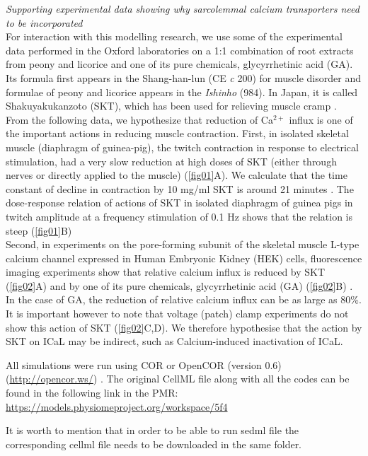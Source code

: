 \documentclass[fleqn,10pt]{physiome}
\begin{document}
\textit{Supporting experimental data showing why sarcolemmal calcium transporters need to be incorporated}\\\newline
For interaction with this modelling research, we use some of the experimental data performed in the Oxford laboratories on a 1:1 combination of root extracts from peony and licorice and one of its pure chemicals, glycyrrhetinic acid (GA). Its formula first appears in the Shang-han-lun (CE \textit{c} 200) for muscle disorder and formulae of peony and licorice appears in the \textit{Ishinho} (984). In Japan, it is called Shakuyakukanzoto (SKT), which has been used for relieving muscle cramp \citep{hyodo2006immediate}. From the following data, we hypothesize that reduction of Ca$^{2+}$ influx is one of the important actions in reducing muscle contraction. First, in isolated skeletal muscle (diaphragm of guinea-pig), the twitch contraction in response to electrical stimulation, had a very slow reduction at high doses of SKT (either through nerves or directly applied to the muscle) (\autoref{fig01}A). We calculate that the time constant of decline in contraction by 10 mg/ml SKT is around 21 minutes \citep{Sam2015Actions}. The dose-response relation of actions of SKT in isolated diaphragm of guinea pigs in twitch amplitude at a frequency stimulation of 0.1 Hz shows that the relation is steep (\autoref{fig01}B) \citep{Sam2015Actions}\\
Second, in experiments on the pore-forming subunit of the skeletal muscle L-type calcium channel expressed in Human Embryonic Kidney (HEK) cells, fluorescence imaging experiments show that relative calcium influx is reduced by SKT (\autoref{fig02}A) and by one of its pure chemicals, glycyrrhetinic acid (GA) (\autoref{fig02}B) \citep{Noble2019Incorporation}. In the case of GA, the reduction of relative calcium influx can be as large as 80\%. It is important however to note that voltage (patch) clamp experiments do not show this action of SKT (\autoref{fig02}C,D). We therefore hypothesise that the action by SKT on ICaL may be indirect, such as Calcium-induced inactivation of ICaL.

All simulations were run using COR or OpenCOR (version 0.6) (\url{http://opencor.ws/}) \citep{Noble2019Incorporation}. 
The original CellML file along with all the codes can be found in the following link in the PMR:\newline
\url{https://models.physiomeproject.org/workspace/5f4}

It is worth to mention that in order to be able to run sedml file the corresponding cellml file needs to be downloaded in the same folder.
\end{document}
